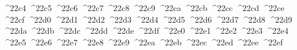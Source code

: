 {  ^^^^22c4%
  ^^^^22c5%
  ^^^^22c6%
  ^^^^22c7%
  ^^^^22c8%
  ^^^^22c9%
  ^^^^22ca%
  ^^^^22cb%
  ^^^^22cc%
  ^^^^22cd%
  ^^^^22ce%
  ^^^^22cf%
  ^^^^22d0%
  ^^^^22d1%
  ^^^^22d2%
  ^^^^22d3%
  ^^^^22d4%
  ^^^^22d5%
  ^^^^22d6%
  ^^^^22d7%
  ^^^^22d8%
  ^^^^22d9%
  ^^^^22da%
  ^^^^22db%
  ^^^^22dc%
  ^^^^22dd%
  ^^^^22de%
  ^^^^22df%
  ^^^^22e0%
  ^^^^22e1%
  ^^^^22e2%
  ^^^^22e3%
  ^^^^22e4%
  ^^^^22e5%
  ^^^^22e6%
  ^^^^22e7%
  ^^^^22e8%
  ^^^^22e9%
  ^^^^22ea%
  ^^^^22eb%
  ^^^^22ec%
  ^^^^22ed%
  ^^^^22ee%
  ^^^^22ef%
}
